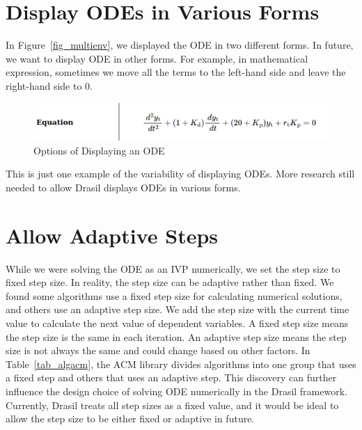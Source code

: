 \section{Display ODEs in Various Forms}
In Figure~\ref{fig_multienv}, we displayed the ODE in two different forms. In future, we want to display ODE in other forms. For example, in mathematical expression, sometimes we move all the terms to the left-hand side and leave the right-hand side to 0.
\begin{figure}[ht]
\centering	
\includegraphics[width=1\textwidth]{figures/ODEVariousForm.png}
\caption{Options of Displaying an ODE}
\label{fig_odevariousform}
\end{figure}
This is just one example of the variability of displaying ODEs. More research still needed to allow Drasil displays ODEs in various forms.

\section{Allow Adaptive Steps}
While we were solving the ODE as an IVP numerically, we set the step size to fixed step size. In reality, the step size can be adaptive rather than fixed. We found some algorithms use a fixed step size for calculating numerical solutions, and others use an adaptive step size. We add the step size with the current time value to calculate the next value of dependent variables. A fixed step size means the step size is the same in each iteration. An adaptive step size means the step size is not always the same and could change based on other factors. In Table~\ref{tab_algacm}, the ACM library divides algorithms into one group that uses a fixed step and others that uses an adaptive step. This discovery can further influence the design choice of solving ODE numerically in the Drasil framework. Currently, Drasil treats all step sizes as a fixed value, and it would be ideal to allow the step size to be either fixed or adaptive in future.

